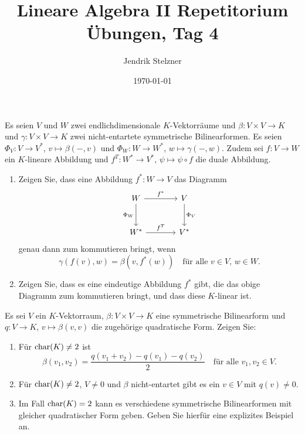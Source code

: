 \documentclass[a4paper, 10pt]{scrartcl}
\title{Lineare Algebra II Repetitorium \\ Übungen, Tag 4}
\author{Jendrik Stelzner}
\date{\today}
\begin{document}
\maketitle


\begin{question}
  Es seien $V$ und $W$ zwei endlichdimensionale $K$-Vektorräume und $\beta \colon V \times V \to K$ und $\gamma \colon V \times V \to K$ zwei nicht-entartete symmetrische Bilinearformen.
  Es seien $\Phi_V \colon V \to V^*$, $v \mapsto \beta(-,v)$ und $\Phi_W \colon W \to W^*$, $w \mapsto \gamma(-,w)$.
  Zudem sei $f \colon V \to W$ ein $K$-lineare Abbildung und $f^T \colon W^* \to V^*$, $\psi \mapsto \psi \circ f$ die duale Abbildung.
  \begin{enumerate}[leftmargin=*]
    \item
      Zeigen Sie, dass eine Abbildung $f^* \colon W \to V$ das Diagramm
      \[
        \begin{tikzcd}[row sep = large, column sep = large, ampersand replacement=\&]
              W
              \arrow{r}{f^*}
              \arrow{d}[left]{\Phi_W}
          \&  V
              \arrow{d}{\Phi_V}
          \\
              W^*
              \arrow{r}{f^T}
          \&  V^*
        \end{tikzcd}
      \]
      genau dann zum kommutieren bringt, wenn
      \[
        \gamma(f(v), w) = \beta(v, f^*(w))
        \quad
        \text{für alle $v \in V$, $w \in W$}.
      \]
    \item
      Zeigen Sie, dass es eine eindeutige Abbildung $f^*$ gibt, die das obige Diagramm zum kommutieren bringt, und dass diese $K$-linear ist.
  \end{enumerate}
\end{question}


\begin{question}
  Es sei $V$ ein $K$-Vektorraum, $\beta \colon V \times V \to K$ eine symmetrische Bilinearform und $q \colon V \to K$, $v \mapsto \beta(v,v)$ die zugehörige quadratische Form.
  Zeigen Sie:
  \begin{enumerate}[leftmargin=*]
    \item
      Für $\operatorname{char}(K) \neq 2$ ist
      \[
          \beta(v_1, v_2)
        = \frac{q(v_1 + v_2) - q(v_1) - q(v_2)}{2}
        \quad
        \text{für alle $v_1, v_2 \in V$}.
      \]
    \item
      Für $\operatorname{char}(K) \neq 2$, $V \neq 0$ und $\beta$ nicht-entartet gibt es ein $v \in V$ mit $q(v) \neq 0$.
    \item
      Im Fall $\operatorname{char}(K) = 2$ kann es verschiedene symmetrische Bilinearformen mit gleicher quadratischer Form geben.
      Geben Sie hierfür eine explizites Beispiel an.
  \end{enumerate}
\end{question}
\end{document}
